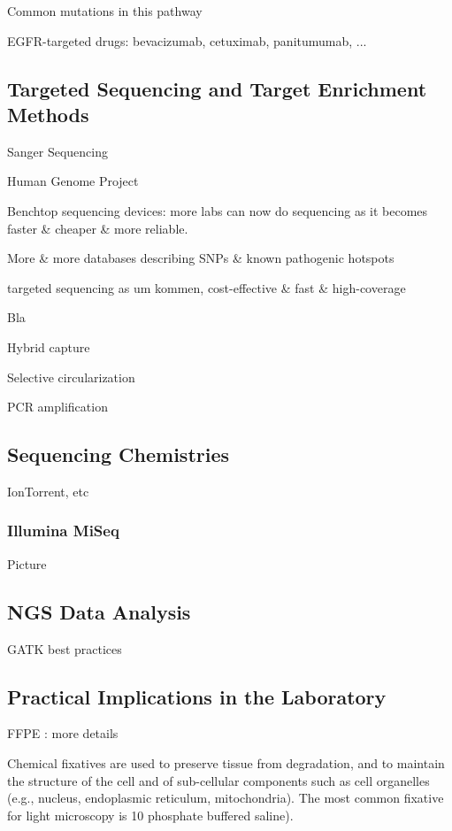 Common mutations in this pathway

EGFR-targeted drugs:
bevacizumab, cetuximab, panitumumab, ...

\subsection{Targeted Sequencing and Target Enrichment Methods}

Sanger Sequencing

Human Genome Project

Benchtop sequencing devices: more labs can now do sequencing as it becomes faster
& cheaper & more reliable. 

More & more databases describing SNPs & known pathogenic hotspots

targeted sequencing as um kommen, cost-effective & fast & high-coverage

Bla {\cite{enrichment_methods:2011}}

Hybrid capture

Selective circularization

PCR amplification

\subsection{Sequencing Chemistries}

IonTorrent, etc

\subsubsection{Illumina MiSeq}

Picture

\subsection{NGS Data Analysis}

GATK best practices

\subsection{Practical Implications in the Laboratory}

FFPE : more details

Chemical fixatives are used to preserve tissue from degradation, and to maintain
the structure of the cell and of sub-cellular components such as cell organelles
(e.g., nucleus, endoplasmic reticulum, mitochondria). The most common fixative
for light microscopy is 10%
phosphate buffered saline).

